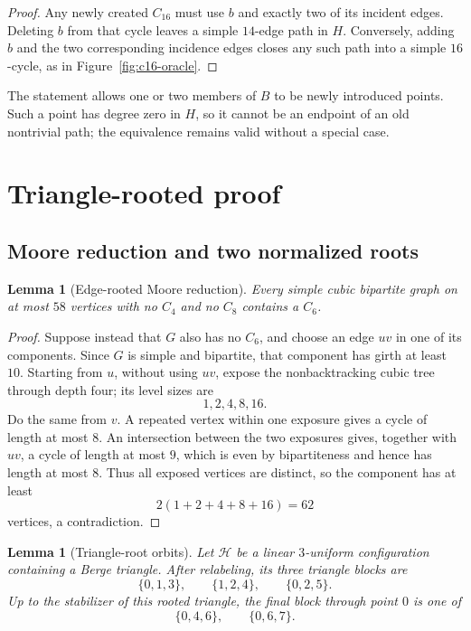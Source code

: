 \documentclass[11pt]{article}
\newtheorem{lemma}[theorem]{Lemma}
\theoremstyle{definition}
\newcommand{\cH}{\mathcal{H}}
\begin{document}
\begin{proof}
Any newly created \(C_{16}\) must use \(b\) and exactly two of its incident
edges. Deleting \(b\) from that cycle leaves a simple \(14\)-edge path in
\(H\). Conversely, adding \(b\) and the two corresponding incidence edges
closes any such path into a simple \(16\)-cycle, as in
Figure~\ref{fig:c16-oracle}.
\end{proof}

The statement allows one or two members of \(B\) to be newly introduced
points.  Such a point has degree zero in \(H\), so it cannot be an endpoint of
an old nontrivial path; the equivalence remains valid without a special case.

\section{Triangle-rooted proof}\label{sec:triangle-rooted}

\subsection{Moore reduction and two normalized roots}

\begin{lemma}[Edge-rooted Moore reduction]\label{lem:moore}
Every simple cubic bipartite graph on at most \(58\) vertices with no
\(C_4\) and no \(C_8\) contains a \(C_6\).
\end{lemma}

\begin{proof}
Suppose instead that \(G\) also has no \(C_6\), and choose an edge \(uv\) in
one of its components. Since \(G\) is simple and bipartite, that component
has girth at least \(10\). Starting from \(u\), without using \(uv\), expose
the nonbacktracking cubic tree through depth four; its level sizes are
\[
  1,2,4,8,16.
\]
Do the same from \(v\). A repeated vertex within one exposure gives a cycle
of length at most \(8\). An intersection between the two exposures gives,
together with \(uv\), a cycle of length at most \(9\), which is even by
bipartiteness and hence has length at most \(8\). Thus all exposed vertices
are distinct, so the component has at least
\[
  2(1+2+4+8+16)=62
\]
vertices, a contradiction.
\end{proof}

\begin{lemma}[Triangle-root orbits]\label{lem:triangle-orbits}
Let \(\cH\) be a linear \(3\)-uniform configuration containing a Berge
triangle. After relabeling, its three triangle blocks are
\[
  \{0,1,3\},\qquad \{1,2,4\},\qquad \{0,2,5\}.
\]
Up to the stabilizer of this rooted triangle, the final block through point
\(0\) is one of
\[
  \{0,4,6\},\qquad \{0,6,7\}.
\]
\end{lemma}
\end{document}
